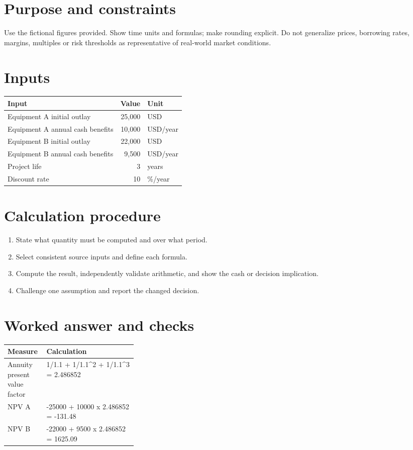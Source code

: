\documentclass[11pt]{article}
\begin{document}
\SuiteOpen
\section{Purpose and constraints}
Use the fictional figures provided. Show time units and formulas; make rounding explicit. Do not generalize prices, borrowing rates, margins, multiples or risk thresholds as representative of real-world market conditions.
\section{Inputs}
\begin{tabularx}{\linewidth}{@{}Y r l@{}}\toprule Input & Value & Unit\\\midrule
Equipment A initial outlay & 25,000 & USD\\
Equipment A annual cash benefits & 10,000 & USD/year\\
Equipment B initial outlay & 22,000 & USD\\
Equipment B annual cash benefits & 9,500 & USD/year\\
Project life & 3 & years\\
Discount rate & 10 & \%/year\\
\bottomrule\end{tabularx}
\section{Calculation procedure}
\begin{enumerate}[leftmargin=*,itemsep=5pt]
\item State what quantity must be computed and over what period.
\item Select consistent source inputs and define each formula.
\item Compute the result, independently validate arithmetic, and show the cash or decision implication.
\item Challenge one assumption and report the changed decision.
\end{enumerate}

\section{Worked answer and checks}
\begin{tabularx}{\linewidth}{@{}p{0.30\linewidth}Y@{}}\toprule Measure & Calculation\\\midrule
Annuity present value factor & 1/1.1 + 1/1.1\textasciicircum{}2 + 1/1.1\textasciicircum{}3 = 2.486852\\
NPV A & -25000 + 10000 x 2.486852 = -131.48\\
NPV B & -22000 + 9500 x 2.486852 = 1625.09\\
\bottomrule\end{tabularx}
\end{document}
